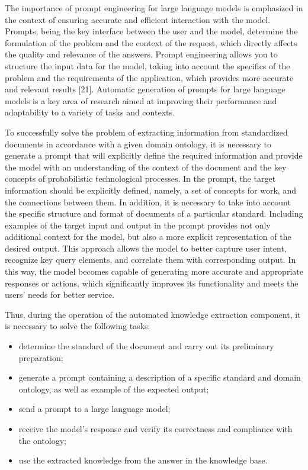 \documentclass{article}
\begin{document}
\begin{SCn}
\begin{multicols}
The importance of prompt engineering for large language models is emphasized in the context of ensuring accurate and efficient interaction with the model. Prompts,
being the key interface between the user and the model,
determine the formulation of the problem and the context
of the request, which directly affects the quality and
relevance of the answers. Prompt engineering allows you
to structure the input data for the model, taking into
account the specifics of the problem and the requirements
of the application, which provides more accurate and
relevant results [21]. Automatic generation of prompts for
large language models is a key area of research aimed at
improving their performance and adaptability to a variety
of tasks and contexts.

To successfully solve the problem of extracting information from standardized documents in accordance with
a given domain ontology, it is necessary to generate a
prompt that will explicitly define the required information and provide the model with an understanding of
the context of the document and the key concepts of
probabilistic technological processes.
In the prompt, the target information should be explicitly defined, namely, a set of concepts for work, and the
connections between them. In addition, it is necessary
to take into account the specific structure and format of
documents of a particular standard. Including examples
of the target input and output in the prompt provides
not only additional context for the model, but also a
more explicit representation of the desired output. This
approach allows the model to better capture user intent,
recognize key query elements, and correlate them with
corresponding output. In this way, the model becomes
capable of generating more accurate and appropriate
responses or actions, which significantly improves its
functionality and meets the users’ needs for better service.

Thus, during the operation of the automated knowledge extraction component, it is necessary to solve the
following tasks:
\begin{itemize}
\item determine the standard of the document and carry
out its preliminary preparation;
\item generate a prompt containing a description of a
specific standard and domain ontology, as well as
example of the expected output;
\item send a prompt to a large language model;
\item receive the model’s response and verify its correctness and compliance with the ontology;
\item use the extracted knowledge from the answer in the
knowledge base.
\end{itemize}
    

\end{multicols}
\end{SCn}
\end{document}
